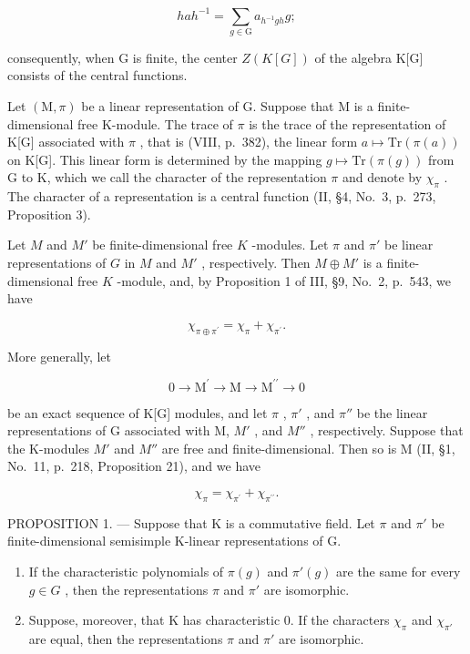 \[
h a h ^ {- 1} = \sum_ {g \in \mathrm{G}} a _ {h ^ {- 1} g h} g;
\]

consequently, when G is finite, the center \(Z(K[G])\) of the algebra K{[}G{]} consists of the central functions.

Let \((\mathrm{M},\pi)\) be a linear representation of G. Suppose that M is a finite-dimensional free K-module. The trace of \(\pi\) is the trace of the representation of K{[}G{]} associated with \(\pi\) , that is (VIII, p.~382), the linear form \(a\mapsto\mathrm{Tr}(\pi(a))\) on K{[}G{]}. This linear form is determined by the mapping \(g\mapsto\mathrm{Tr}(\pi(g))\) from G to K, which we call the character of the representation \(\pi\) and denote by \(\chi_{\pi}\) . The character of a representation is a central function (II, §4, No.~3, p.~273, Proposition 3).

Let \(M\) and \(M'\) be finite-dimensional free \(K\) -modules. Let \(\pi\) and \(\pi'\) be linear representations of \(G\) in \(M\) and \(M'\) , respectively. Then \(M \oplus M'\) is a finite-dimensional free \(K\) -module, and, by Proposition 1 of III, §9, No.~2, p.~543, we have

\[
\chi_ {\pi \oplus \pi^ {\prime}} = \chi_ {\pi} + \chi_ {\pi^ {\prime}}.
\]

More generally, let

\[
0 \longrightarrow \mathrm{M} ^ {\prime} \longrightarrow \mathrm{M} \longrightarrow \mathrm{M} ^ {\prime \prime} \longrightarrow 0
\]

be an exact sequence of K{[}G{]} modules, and let \(\pi\) , \(\pi'\) , and \(\pi''\) be the linear representations of G associated with M, \(M'\) , and \(M''\) , respectively. Suppose that the K-modules \(M'\) and \(M''\) are free and finite-dimensional. Then so is M (II, §1, No.~11, p.~218, Proposition 21), and we have

\[
\chi_ {\pi} = \chi_ {\pi^ {\prime}} + \chi_ {\pi^ {\prime \prime}}.\tag{1}
\]

PROPOSITION 1. --- Suppose that K is a commutative field. Let \(\pi\) and \(\pi'\) be finite-dimensional semisimple K-linear representations of G.

\begin{enumerate}
\def\labelenumi{\alph{enumi})}
\item
  If the characteristic polynomials of \(\pi(g)\) and \(\pi'(g)\) are the same for every \(g \in G\) , then the representations \(\pi\) and \(\pi'\) are isomorphic.
\item
  Suppose, moreover, that K has characteristic 0. If the characters \(\chi_{\pi}\) and \(\chi_{\pi'}\) are equal, then the representations \(\pi\) and \(\pi'\) are isomorphic.
\end{enumerate}

